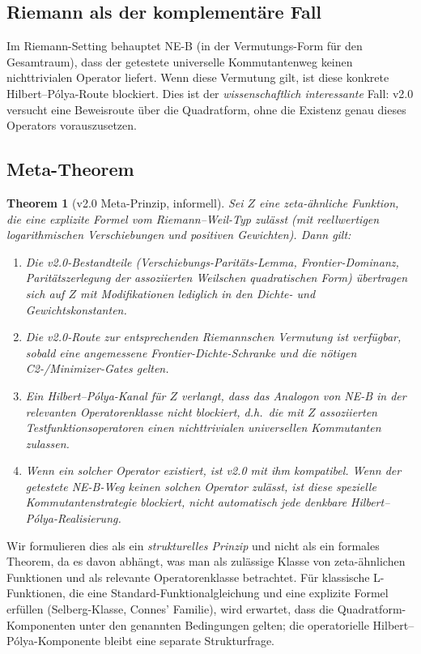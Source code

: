 \documentclass[12pt,a4paper]{article}
\newtheorem{theorem}{Theorem}[section]
\theoremstyle{definition}
\theoremstyle{remark}
\begin{document}
\subsection{Riemann als der komplementäre Fall}

Im Riemann-Setting behauptet NE-B (in der Vermutungs-Form für den Gesamtraum),
dass der getestete universelle Kommutantenweg keinen nichttrivialen Operator
liefert. Wenn diese Vermutung gilt, ist diese konkrete Hilbert--Pólya-Route
blockiert. Dies ist der \emph{wissenschaftlich interessante} Fall: v2.0 versucht
eine Beweisroute über die Quadratform, ohne die Existenz genau dieses
Operators vorauszusetzen.

\subsection{Meta-Theorem}

\begin{theorem}[v2.0 Meta-Prinzip, informell]
\label{thm:meta}
Sei $Z$ eine zeta-ähnliche Funktion, die eine explizite Formel vom
Riemann--Weil-Typ zulässt (mit reellwertigen logarithmischen Verschiebungen und positiven Gewichten).
Dann gilt:
\begin{enumerate}[label=(\roman*)]
\item Die v2.0-Bestandteile (Verschiebungs-Paritäts-Lemma, Frontier-Dominanz,
Paritätszerlegung der assoziierten Weilschen quadratischen Form) übertragen sich auf $Z$
mit Modifikationen lediglich in den Dichte- und Gewichtskonstanten.
\item Die v2.0-Route zur entsprechenden Riemannschen Vermutung ist verfügbar,
sobald eine angemessene Frontier-Dichte-Schranke und die nötigen
C2-/Minimizer-Gates gelten.
\item Ein Hilbert--Pólya-Kanal für $Z$ verlangt, dass das Analogon von NE-B
in der relevanten Operatorenklasse nicht blockiert, d.h.\ die mit $Z$
assoziierten Testfunktionsoperatoren einen nichttrivialen universellen
Kommutanten zulassen.
\item Wenn ein solcher Operator existiert, ist v2.0 mit ihm kompatibel. Wenn der
getestete NE-B-Weg keinen solchen Operator zulässt, ist diese spezielle
Kommutantenstrategie blockiert, nicht automatisch jede denkbare
Hilbert--Pólya-Realisierung.
\end{enumerate}
\end{theorem}

Wir formulieren dies als ein \emph{strukturelles Prinzip} und nicht als ein formales
Theorem, da es davon abhängt, was man als zulässige Klasse von
zeta-ähnlichen Funktionen und als relevante Operatorenklasse betrachtet. Für
klassische L-Funktionen, die eine Standard-Funktionalgleichung und eine
explizite Formel erfüllen (Selberg-Klasse, Connes' Familie), wird erwartet,
dass die Quadratform-Komponenten unter den genannten Bedingungen gelten; die
operatorielle Hilbert--Pólya-Komponente bleibt eine separate Strukturfrage.
\end{document}
